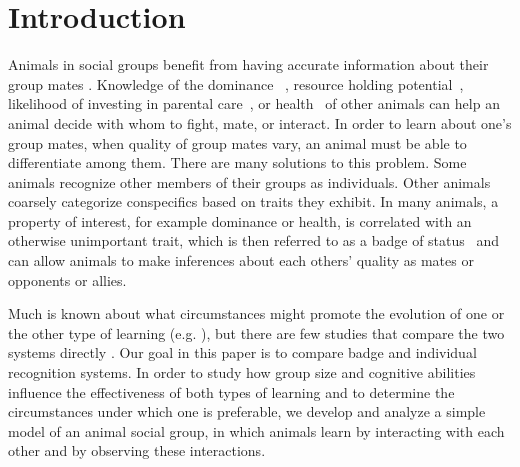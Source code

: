 \section*{Introduction} 
Animals in social groups benefit from having accurate information about their group mates \citep{Seyfarth:2010bh}. Knowledge of the dominance ~\citep{Waal:1986ys,Cowlishaw:1990vn,Bergman:2003qf,Seyfarth:2005ve,Flack:2006uq,Hobson:2015uq}, resource holding potential~\citep{Rhijn:1980uq,Freeman:1985kl,Dick:1990cr,Lemel:1993ve}, likelihood of investing in parental care~\citep{Qvarnstrom:1997fk,Olsen:2010uq}, or health~\citep{Folstad:1992kx,Loyau:2005nx} of other animals can help an animal decide with whom to fight, mate, or interact. In order to learn about one's group mates, when quality of group mates vary, an animal must be able to differentiate among them. There are many solutions to this problem. Some animals recognize other members of their groups as individuals. Other animals coarsely categorize conspecifics based on traits they exhibit. In many animals, a property of interest, for example dominance or health, is correlated with an otherwise unimportant trait, which is then referred to as a badge of status~\citep{dawkins1978signals,Rohwer:1981vn,Rohwer:1982fk} and can allow animals to make inferences about each others' quality as mates or opponents or allies. 

Much is known about what circumstances might promote the evolution of one or the other type of learning (e.g. \citep{Whitfield:1987tg,Rohwer:1975fk,Lemel:1993ve,Solberg:1997uq,Tibbetts:2009kx,Remy:2010fk,Sheehan:2014fk}), but there are few studies that compare the two systems directly \citep{sheehan2016evotradeoff}. Our goal in this paper is to compare badge and individual recognition systems. In order to study how group size and cognitive abilities influence the effectiveness of both types of learning and to determine the circumstances under which one is preferable, we develop and analyze a simple model of an animal social group, in which animals learn by interacting with each other and by observing these interactions.  

